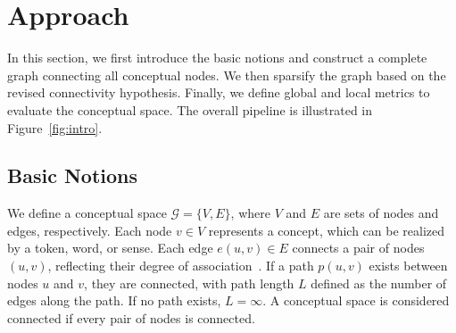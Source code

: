 



\section{Approach}
\label{sec:approach}


In this section, we first introduce the basic notions and construct a complete graph connecting all conceptual nodes. We then sparsify the graph based on the revised connectivity hypothesis. Finally, we define global and local metrics to evaluate the conceptual space. The overall pipeline is illustrated in Figure~\ref{fig:intro}.

\subsection{Basic Notions}
We define a conceptual space $\mathcal{G} = \{V, E\}$, where $V$ and $E$ are sets of nodes and edges, respectively. Each node $v \in V$ represents a concept, which can be realized by a token, word, or sense. Each edge $e(u,v) \in E$ connects a pair of nodes $(u,v)$, reflecting their degree of association~\cite{guo2012concepts}. If a path $p(u,v)$ exists between nodes $u$ and $v$, they are connected, with path length $L$ defined as the number of edges along the path. If no path exists, $L = \infty$. A conceptual space is considered connected if every pair of nodes is connected.

